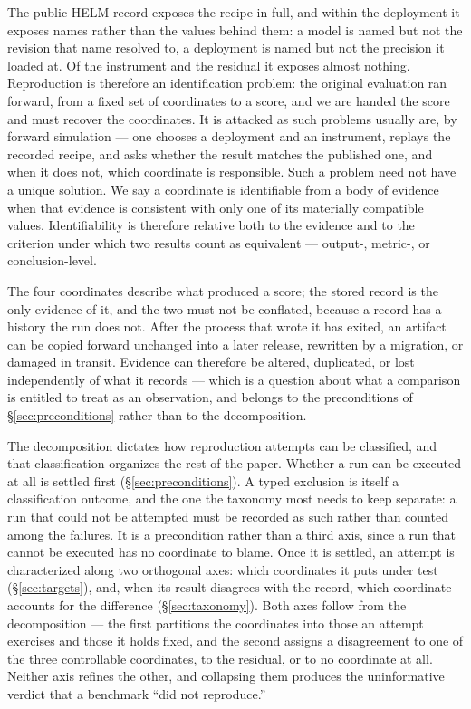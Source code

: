 The public HELM record exposes the recipe in full, and within the deployment it exposes names rather than the values behind them: a model is named but not the revision that name resolved to, a deployment is named but not the precision it loaded at. Of the instrument and the residual it exposes almost nothing. Reproduction is therefore an identification problem: the original evaluation ran forward, from a fixed set of coordinates to a score, and we are handed the score and must recover the coordinates. It is attacked as such problems usually are, by forward simulation --- one chooses a deployment and an instrument, replays the recorded recipe, and asks whether the result matches the published one, and when it does not, which coordinate is responsible. Such a problem need not have a unique solution. We say a coordinate is identifiable from a body of evidence when that evidence is consistent with only one of its materially compatible values. Identifiability is therefore relative both to the evidence and to the criterion under which two results count as equivalent --- output-, metric-, or conclusion-level.

The four coordinates describe what produced a score; the stored record is the only evidence of it, and the two must not be conflated, because a record has a history the run does not. After the process that wrote it has exited, an artifact can be copied forward unchanged into a later release, rewritten by a migration, or damaged in transit. Evidence can therefore be altered, duplicated, or lost independently of what it records --- which is a question about what a comparison is entitled to treat as an observation, and belongs to the preconditions of \S\ref{sec:preconditions} rather than to the decomposition.

The decomposition dictates how reproduction attempts can be classified, and that classification organizes the rest of the paper. Whether a run can be executed at all is settled first (\S\ref{sec:preconditions}). A typed exclusion is itself a classification outcome, and the one the taxonomy most needs to keep separate: a run that could not be attempted must be recorded as such rather than counted among the failures. It is a precondition rather than a third axis, since a run that cannot be executed has no coordinate to blame. Once it is settled, an attempt is characterized along two orthogonal axes: which coordinates it puts under test (\S\ref{sec:targets}), and, when its result disagrees with the record, which coordinate accounts for the difference (\S\ref{sec:taxonomy}). Both axes follow from the decomposition --- the first partitions the coordinates into those an attempt exercises and those it holds fixed, and the second assigns a disagreement to one of the three controllable coordinates, to the residual, or to no coordinate at all. Neither axis refines the other, and collapsing them produces the uninformative verdict that a benchmark ``did not reproduce.''

